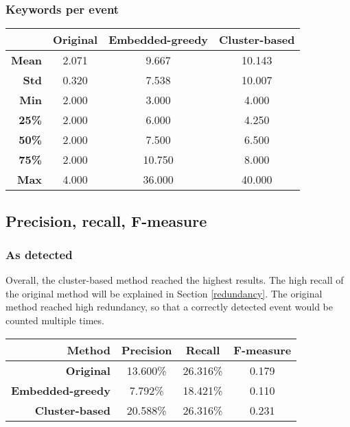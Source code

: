 \documentclass[a4paper]{article}
\begin{document}
\subsubsection{Keywords per event}
\begin{center}
\begin{tabular}{r c c c} \toprule[1.5pt]
& \bf Original & \bf Embedded-greedy & \bf Cluster-based \\ \midrule
\bf Mean & 2.071 & 9.667 & 10.143 \\
\bf Std	& 0.320 & 7.538 & 10.007 \\
\bf Min	& 2.000	& 3.000 & 4.000 \\
\bf 25\% & 2.000 & 6.000 & 4.250 \\
\bf 50\% & 2.000 & 7.500 & 6.500 \\
\bf 75\% & 2.000 & 10.750 & 8.000 \\
\bf Max	& 4.000 & 36.000 & 40.000 \\ \bottomrule[1.25pt]
\end{tabular}
\end{center}

\subsection{Precision, recall, F-measure}

\subsubsection{As detected}
Overall, the cluster-based method reached the highest results. The high recall of the original method will be explained in Section \ref{redundancy}. The original method reached high redundancy, so that a correctly detected event would be counted multiple times.
\begin{center}
\begin{tabular}{r c c c} \toprule[1.5pt]
\bf Method & \bf Precision & \bf Recall & \bf F-measure \\ \midrule
\bf Original & 13.600\% & 26.316\% & 0.179 \\
\bf Embedded-greedy & 7.792\% & 18.421\% & 0.110 \\
\bf Cluster-based & 20.588\% & 26.316\% & 0.231 \\ \bottomrule[1.25pt]
\end{tabular}
\end{center}
\end{document}
